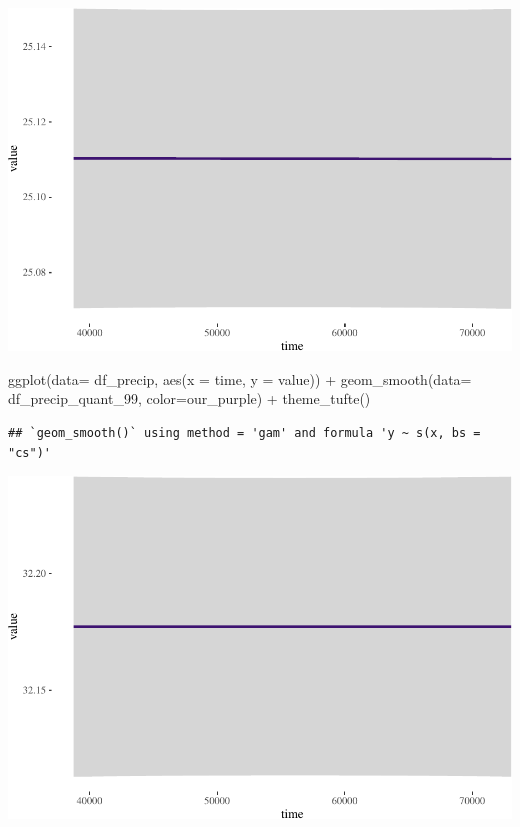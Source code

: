 \documentclass[
  paper=a4,
  ,captions=tableheading
]{scrartcl}
\newenvironment{Shaded}{\begin{snugshade}}{\end{snugshade}}
\newcommand{\AttributeTok}[1]{\textcolor[rgb]{0.77,0.63,0.00}{#1}}
\newcommand{\FunctionTok}[1]{\textcolor[rgb]{0.00,0.00,0.00}{#1}}
\newcommand{\NormalTok}[1]{#1}
\newcommand{\SpecialCharTok}[1]{\textcolor[rgb]{0.00,0.00,0.00}{#1}}
\begin{document}
\includegraphics{Haskell_files/figure-latex/unnamed-chunk-49-5.pdf}

\begin{Shaded}
\begin{Highlighting}[]
\FunctionTok{ggplot}\NormalTok{(}\AttributeTok{data=}\NormalTok{ df\_precip, }\FunctionTok{aes}\NormalTok{(}\AttributeTok{x =}\NormalTok{ time, }\AttributeTok{y =}\NormalTok{ value)) }\SpecialCharTok{+} 
     \FunctionTok{geom\_smooth}\NormalTok{(}\AttributeTok{data=}\NormalTok{ df\_precip\_quant\_99, }\AttributeTok{color=}\NormalTok{our\_purple) }\SpecialCharTok{+}
  \FunctionTok{theme\_tufte}\NormalTok{()}
\end{Highlighting}
\end{Shaded}

\begin{verbatim}
## `geom_smooth()` using method = 'gam' and formula 'y ~ s(x, bs = "cs")'
\end{verbatim}

\includegraphics{Haskell_files/figure-latex/unnamed-chunk-49-6.pdf}
\end{document}
